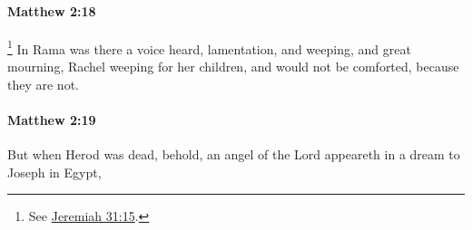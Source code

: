 		\paragraph{Matthew 2:18} %
			\label{MATTHEW-2-18}

				\footnote{%
					See \hyperref[JEREMIAH-31-15]{Jeremiah 31:15}.
					}%
			In Rama was there a voice heard, lamentation, and weeping, and great mourning, Rachel weeping for her children, and would not be comforted, because they are not.

			\begin{framed}
			\scriptsize
				\begin{compactdesc}
					\item[SBLG] 
				\end{compactdesc}
			\end{framed}

		\paragraph{Matthew 2:19} %
			\label{MATTHEW-2-19}

			But when Herod was dead, behold, an angel of the Lord appeareth in a dream to Joseph in Egypt,

